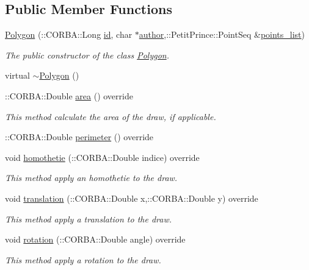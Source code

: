 \subsection*{Public Member Functions}
\begin{DoxyCompactItemize}
\item 
\hyperlink{class_polygon_ab8d27e5325ac69c6d2db764b937b267f}{Polygon} (\+::C\+O\+R\+B\+A\+::\+Long \hyperlink{class_draw_a1bf27c5a59da9002d55936c947dce2cc}{id}, char $\ast$\hyperlink{class_draw_a4781c654db63e069c8c5be017f6ccc34}{author},\+::Petit\+Prince\+::\+Point\+Seq \&\hyperlink{class_polygon_ac4696400cdaea4ebc21aaf5c3d078821}{points\+\_\+list})
\begin{DoxyCompactList}\small\item\em The public constructor of the class \hyperlink{class_polygon}{Polygon}. \end{DoxyCompactList}\item 
virtual \hyperlink{class_polygon_a873f9acee059f717277b6414102dab16}{$\sim$\+Polygon} ()
\item 
\+::C\+O\+R\+B\+A\+::\+Double \hyperlink{class_polygon_aed25bd8066aa2351f3f0fee637589475}{area} () override
\begin{DoxyCompactList}\small\item\em This method calculate the area of the draw, if applicable. \end{DoxyCompactList}\item 
\+::C\+O\+R\+B\+A\+::\+Double \hyperlink{class_polygon_a9ad18d5fdbdf570f38097d284cd99479}{perimeter} () override
\item 
void \hyperlink{class_polygon_ae1655403c2eda0e8f0ccd5568df9ea37}{homothetie} (\+::C\+O\+R\+B\+A\+::\+Double indice) override
\begin{DoxyCompactList}\small\item\em This method apply an homothetie to the draw. \end{DoxyCompactList}\item 
void \hyperlink{class_polygon_a26aab117b0f9e6c631f6dc614c9e6c45}{translation} (\+::C\+O\+R\+B\+A\+::\+Double x,\+::C\+O\+R\+B\+A\+::\+Double y) override
\begin{DoxyCompactList}\small\item\em This method apply a translation to the draw. \end{DoxyCompactList}\item 
void \hyperlink{class_polygon_a7b9ac9fd10517427747e656ab2c9c025}{rotation} (\+::C\+O\+R\+B\+A\+::\+Double angle) override
\begin{DoxyCompactList}\small\item\em This method apply a rotation to the draw. \end{DoxyCompactList}\item 

\end{DoxyCompactItemize}
